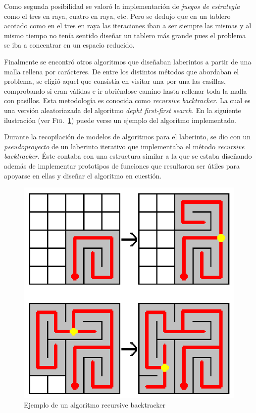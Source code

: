 \documentclass[12pt,a4paper]{article}
\begin{document}
Como segunda posibilidad se valoró la implementación de \textit{juegos de estrategia} como el tres en raya, cuatro en raya, etc. Pero se dedujo que en un tablero acotado como en el tres en raya las iteraciones iban a ser siempre las mismas y al mismo tiempo no tenía sentido diseñar un tablero más grande pues el problema se iba a concentrar en un espacio reducido.

\vspace{0.2cm}

Finalmente se encontró otros algoritmos que diseñaban laberintos a partir de una malla rellena por carácteres. De entre los distintos métodos que abordaban el problema, se eligió aquel que consistía en visitar una por una las casillas, comprobando si eran válidas e ir abriéndose camino hasta rellenar toda la malla con pasillos. Esta metodología es conocida como \textit{recursive backtracker}\cite{wiki}. La cual es una versión aleatoriazada del algoritmo \textit{depht first-first search}. En la siguiente ilustración (ver \textsc{Fig.}~\ref{back_tracker_label}) puede verse un ejemplo del algoritmo implementado.

\vspace{0.2cm}
Durante la recopilación de modelos de algoritmos para el laberinto, se dio con un \textit{pseudoproyecto} de un laberinto iterativo que implementaba el método \textit{recursive backtracker}. Éste contaba con una estructura similar a la que se estaba diseñando además de implementar prototipos de funciones que resultaron ser útiles para apoyarse en ellas y diseñar el algoritmo en cuestión.

\begin{figure}[H]
	\centering
	\includegraphics[scale=0.4]{fotos/back_tracker.png}
	\caption{Ejemplo de un algoritmo recursive backtracker \cite{back_tracker}}
	\label{back_tracker_label}
\end{figure}
\end{document}
